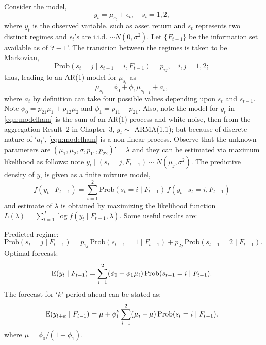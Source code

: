 Consider the model,
	\begin{equation} \label{eqn:modelham}
	y_t = \mu_{s_t} + \epsilon_t, \quad s_t= 1, 2,
	\end{equation} 
where $y_t$ is the observed variable, such as asset return and $s_t$ represents two distinct regimes and $\epsilon_t$'s are i.i.d. $\sim N(0,\sigma^2)$. Let $\{ F_{t-1} \}$ be the information set available as of `$t-1$'. The transition between the regimes is taken to be Markovian,
	\begin{equation} \label{eqn:markprob}
	\text{Prob}(s_t= j \;|\; s_{t-1}= i, F_{t-1}) = p_{ij}, \quad i,j= 1, 2;
	\end{equation}
thus, leading to an AR(1) model for $\mu_{s_t}$ as
	\begin{equation} \label{eqn:must}
	\mu_{s_t} = \phi_0 + \phi_1 \mu_{s_{t-1}} + a_t,
	\end{equation}
where $a_t$ by definition can take four possible values depending upon $s_t$ and $s_{t-1}$. Note $\phi_0= p_{21} \mu_1 + p_{12} \mu_2$ and $\phi_1= p_{11} - p_{21}$. Also, note the model for $y_t$ in \eqref{eqn:modelham} is the sum of an AR(1) process and white noise, then from the aggregation Result~2 in Chapter~3, $y_t \sim$ ARMA(1,1); but because of discrete nature of `$a_t$', \eqref{eqn:modelham} is a non-linear process. Observe that the unknown parameters are $(\mu_1, \mu_2, \sigma,p_{11}, p_{22})'= \lambda$ and they can be estimated via maximum likelihood as follows: note $y_t \;|\; (s_t= j, F_{t-1}) \sim N(\mu_j,\sigma^2)$. The predictive density of $y_t$ is given as a finite mixture model,
	\begin{equation}\label{eqn:predden}
	f(y_t \;|\; F_{t-1})= \sum_{i=1}^2 \text{Prob}(s_t= i \;|\; F_{t-1}) \, f(y_t \;|\; s_t= i, F_{t-1})
	\end{equation}
and estimate of $\lambda$ is obtained by maximizing the likelihood function $L(\lambda)= \sum_{t=1}^T \log f(y_t \;|\; F_{t-1}, \lambda)$. Some useful results are: \twomedskip


\noindent Predicted regime: 
	\begin{equation} \label{eqn:predreg}
	\text{Prob}(s_t= j \;|\; F_{t-1})= p_{1j}\, \text{Prob}(s_{t-1}=1 \;|\; F_{t-1}) + p_{2j} \,\text{Prob}(s_{t-1}=2 \;|\; F_{t-1}).
	\end{equation}
\noindent Optimal forecast:
	\begin{equation} \label{eqn:optfore}
	\Ex(y_t \;|\; F_{t-1})= \sum_{i=1}^2 (\phi_0+\phi_1 \mu_i)\, \text{Prob}(s_{t-1}=i \;|\; F_{t-1}).
	\end{equation}
The forecast for `$k$' period ahead can be stated as:
	\begin{equation} \label{eqn:period}
	\Ex(y_{t+k} \;|\; F_{t-1}) = \mu+\phi_1^k \sum_{i=1}^2 (\mu_i-\mu)\, \text{Prob}(s_t=i \;|\; F_{t-1}),
	\end{equation}
where $\mu=\phi_0/(1-\phi_1)$.


